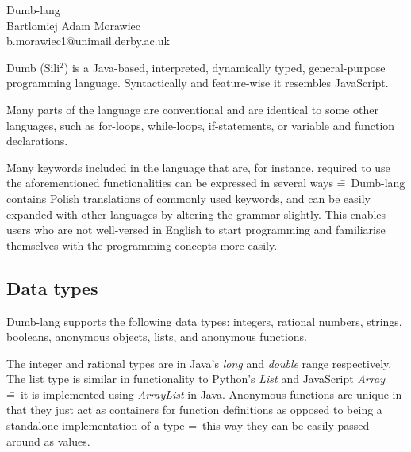 \documentclass[12pt,a4paper]{article}
\begin{document}
\begin{center}
  \Huge {Dumb-lang}\\[0.25cm]
  \small {Bartlomiej Adam Morawiec\\
  b.morawiec1@unimail.derby.ac.uk}\par
\end{center}

\noindent Dumb (Sili$^2$) is a Java-based, interpreted, dynamically typed, general-purpose programming language. Syntactically and feature-wise it resembles JavaScript.\par

Many parts of the language are conventional and are identical to some other languages, such as for-loops, while-loops, if-statements, or variable and function declarations.\par

Many keywords included in the language that are, for instance, required to use the aforementioned functionalities can be expressed in several ways \==~Dumb-lang contains Polish translations of commonly used keywords, and can be easily expanded with other languages by altering the grammar slightly. This enables users who are not well-versed in English to start programming and familiarise themselves with the programming concepts more easily.



\subsection*{Data types}


Dumb-lang supports the following data types: integers, rational numbers, strings, booleans, anonymous objects, lists, and anonymous functions.\par

The integer and rational types are in Java's \emph{long} and \emph{double} range respectively. The list type is similar in functionality to Python's \emph{List} and JavaScript \emph{Array} \==~it is implemented using \emph{ArrayList} in Java. Anonymous functions are unique in that they just act as containers for function definitions as opposed to being a standalone implementation of a type \==~this way they can be easily passed around as values.
\end{document}
